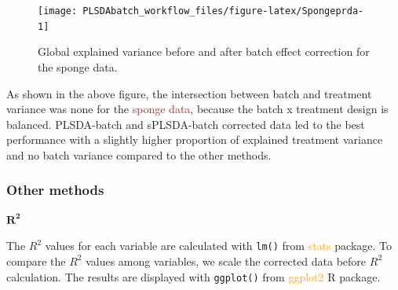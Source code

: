 \documentclass[
]{book}
\begin{document}
\begin{figure}

{\centering \texttt{[image: PLSDAbatch\_workflow\_files/figure-latex/Spongeprda-1]} 

}

\caption{Global explained variance before and after batch effect correction for the sponge data.}\label{fig:Spongeprda}
\end{figure}

As shown in the above figure, the intersection between batch and treatment variance was none for the \textcolor{brown}{sponge data}, because the batch x treatment design is balanced. PLSDA-batch and sPLSDA-batch corrected data led to the best performance with a slightly higher proportion of explained treatment variance and no batch variance compared to the other methods.

\hypertarget{other-methods}{%
\subsubsection{Other methods}\label{other-methods}}

\(\mathbf{R^2}\)

The \(R^2\) values for each variable are calculated with \texttt{lm()} from \textcolor{orange}{stats} package. To compare the \(R^2\) values among variables, we scale the corrected data before \(R^2\) calculation. The results are displayed with \texttt{ggplot()} from \textcolor{orange}{ggplot2} R package.
\end{document}
